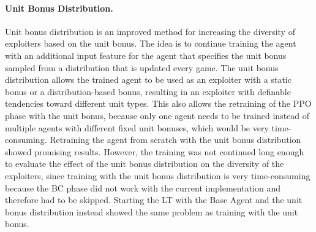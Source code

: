 \documentclass[10pt,twocolumn,letterpaper]{article}
\begin{document}
\paragraph{Unit Bonus Distribution.}
\label{par:unit_bonus_distribution}
Unit bonus distribution is an improved method for increasing the diversity of exploiters based on the unit bonus.
The idea is to continue training the agent with an additional input feature for the agent that specifies the unit bonus sampled from a distribution that is updated every game.
\break\break
The unit bonus distribution allows the trained agent to be used as an exploiter with a static bonus or a distribution-based bonus, resulting in an exploiter with definable tendencies toward different unit types.
This also allows the retraining of the PPO phase with the unit bonus, because only one agent needs to be trained instead of multiple agents with different fixed unit bonuses, which would be very time-consuming.
Retraining the agent from scratch with the unit bonus distribution showed promising results.
However, the training was not continued long enough to evaluate the effect of the unit bonus distribution on the diversity of the exploiters, since training with the unit bonus distribution is very time-consuming because the BC phase did not work with the current implementation and therefore had to be skipped.
Starting the LT with the Base Agent and the unit bonus distribution instead showed the same problem as training with the unit bonus.
\end{document}

